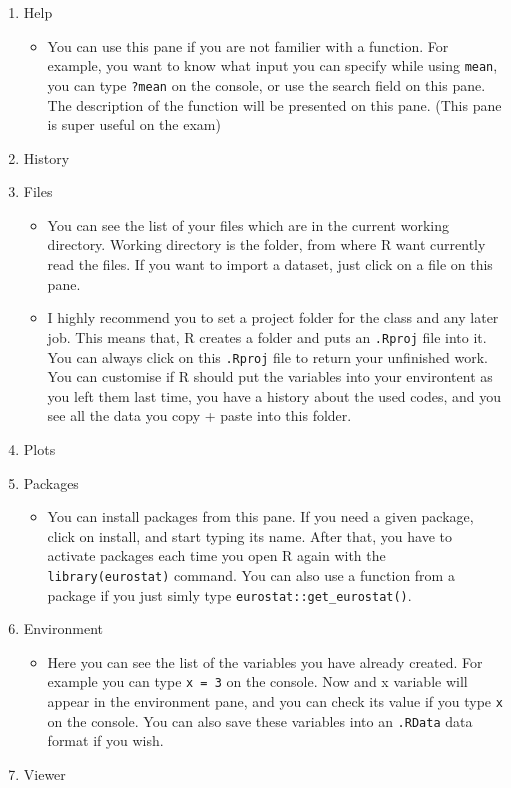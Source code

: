 \documentclass[
]{article}
\providecommand{\tightlist}{%
  \setlength{\itemsep}{0pt}\setlength{\parskip}{0pt}}
\begin{document}
\begin{enumerate}
\def\labelenumi{\arabic{enumi}.}
\setcounter{enumi}{2}
\item
  Help

  \begin{itemize}
  \tightlist
  \item
    You can use this pane if you are not familier with a function. For example, you want to know what input you can specify while using \texttt{mean}, you can type \texttt{?mean} on the console, or use the search field on this pane. The description of the function will be presented on this pane. (This pane is super useful on the exam)
  \end{itemize}
\item
  History
\item
  Files

  \begin{itemize}
  \tightlist
  \item
    You can see the list of your files which are in the current working directory. Working directory is the folder, from where R want currently read the files. If you want to import a dataset, just click on a file on this pane.
  \item
    I highly recommend you to set a project folder for the class and any later job. This means that, R creates a folder and puts an \texttt{.Rproj} file into it. You can always click on this \texttt{.Rproj} file to return your unfinished work. You can customise if R should put the variables into your environtent as you left them last time, you have a history about the used codes, and you see all the data you copy + paste into this folder.
  \end{itemize}
\item
  Plots
\item
  Packages

  \begin{itemize}
  \tightlist
  \item
    You can install packages from this pane. If you need a given package, click on install, and start typing its name. After that, you have to activate packages each time you open R again with the \texttt{library(eurostat)} command. You can also use a function from a package if you just simly type \texttt{eurostat::get\_eurostat()}.
  \end{itemize}
\item
  Environment

  \begin{itemize}
  \tightlist
  \item
    Here you can see the list of the variables you have already created. For example you can type \texttt{x\ =\ 3} on the console. Now and x variable will appear in the environment pane, and you can check its value if you type \texttt{x} on the console. You can also save these variables into an \texttt{.RData} data format if you wish.
  \end{itemize}
\item
  Viewer
\end{enumerate}
\end{document}
